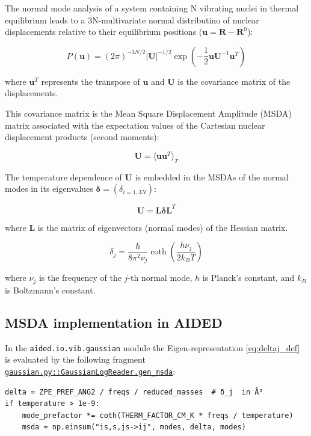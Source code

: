 \documentclass{standalone}
\begin{document}
The normal mode analysis of a system containing N vibrating nuclei in thermal equilibrium
leads to a 3N-multivariate normal distributino of nuclear displacements relative to their
equilibrium positions ($\mathbf{u} = \mathbf{R} - \mathbf{R}^0$):

\begin{equation}
\label{eq:Pu}
P(\mathbf{u}) = (2\pi)^{-3N/2} |\mathbf{U}|^{-1/2} \exp\left(-\frac{1}{2} \mathbf{u} \mathbf{U}^{-1} \mathbf{u}^T\right)
\end{equation}

where $\mathbf{u}^T$ represents the transpose of $\mathbf{u}$ and $\mathbf{U}$ is the covariance matrix of the displacements.

This covariance matrix is the  Mean Square Displacement Amplitude (MSDA) matrix associated with
the expectation values of the Cartesian nuclear displacement products (second moments):

$$
\mathbf{U} = \langle \mathbf{u} \mathbf{u}^T \rangle_T
$$

The temperature dependence of $\mathbf{U}$ is embedded in the MSDAs of the normal modes in its eigenvalues
$\mathbf{\delta} = (\delta_{i=1,3N})$:

\begin{equation}
\label{eq:ULdL}
\mathbf{U} = \mathbf{L} \mathbf{\delta} \mathbf{L}^T
\end{equation}

where $\mathbf{L}$ is the matrix of eigenvectors (normal modes) of the Hessian matrix.

\begin{equation}
\label{eq:deltaj_def}
\delta_j = \frac{h}{8 \pi^2 \nu_j} \coth\left( \frac{h \nu_j}{2 k_B T} \right)
\end{equation}

where $\nu_j$ is the frequency of the $j$-th normal mode, $h$ is Planck's constant, and $k_B$ is Boltzmann's constant.

\subsection{MSDA implementation in AIDED}

In the \texttt{aided.io.vib.gaussian} module the Eigen‑representation
\eqref{eq:deltaj_def} is evaluated by the following fragment
\href{https://github.com/drjrm3/aided/blob/main/aided/io/vib/gaussian.py}
{\texttt{gaussian.py::GaussianLogReader.gen\_msda}}:
\begin{verbatim}
delta = ZPE_PREF_ANG2 / freqs / reduced_masses  # δ_j  in Å²
if temperature > 1e-9:
    mode_prefactor *= coth(THERM_FACTOR_CM_K * freqs / temperature)
    msda = np.einsum("is,s,js->ij", modes, delta, modes)
\end{verbatim}
\end{document}
